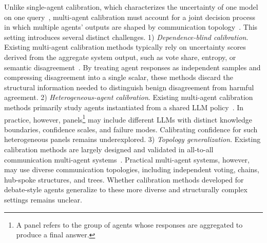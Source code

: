 Unlike single-agent calibration, which characterizes the uncertainty of one model on one query~\citep{zhou2026steerconf,bani2026rewarding}, multi-agent calibration must account for a joint decision process in which multiple agents’ outputs are shaped by communication topology~\cite{huang2026evolverouter,zhang2025agentrouter,shi2026ng}. This setting introduces several distinct challenges.
1) \textit{Dependence-blind calibration}. Existing multi-agent calibration methods typically rely on uncertainty scores derived from the aggregate system output, such as vote share, entropy, or semantic disagreement~\citep{wang2023selfconsistencyimproveschainthought,kadavath2022languagemodelsmostlyknow,feng2025rethinkingllmuncertaintymultiagent,jiang2026discouq,chen2026responsecountsquantifyinguncertainty}. By treating agent responses as independent samples and compressing disagreement into a single scalar, these methods discard the structural information needed to distinguish benign disagreement from harmful agreement.
 2) \textit{Heterogeneous-agent calibration}. Existing multi-agent calibration methods primarily study agents instantiated from a shared LLM policy~\citep{zhu2026demystifying,qiao2026epistemic}. In practice, however, panels\footnote{A panel refers to the group of agents whose responses are aggregated to produce a final answer.} may include different LLMs with distinct knowledge boundaries, confidence scales, and failure modes. Calibrating confidence for such heterogeneous panels remains underexplored.
3) \textit{Topology generalization}. Existing calibration methods are largely designed and validated in all-to-all communication multi-agent systems~\citep{zhu2026demystifying,qiao2026epistemic}. Practical multi-agent systems, however, may use diverse communication topologies, including independent voting, chains, hub-spoke structures, and trees. Whether calibration methods developed for debate-style agents generalize to these more diverse and structurally complex settings remains unclear.

